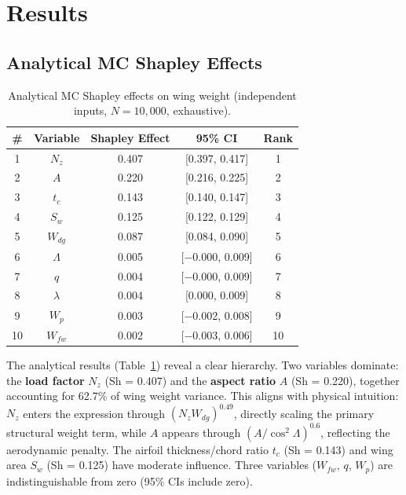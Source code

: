 \documentclass[11pt,a4paper]{article}
\begin{document}
\section{Results}

\subsection{Analytical MC Shapley Effects}

\begin{table}[H]
\centering
\caption{Analytical MC Shapley effects on wing weight (independent inputs, $N = 10{,}000$, exhaustive).}
\label{tab:shap_analytical}
\begin{tabular}{ccccc}
\toprule
\textbf{\#} & \textbf{Variable} & \textbf{Shapley Effect} & \textbf{95\% CI} & \textbf{Rank} \\
\midrule
1  & $N_z$   & 0.407 & [0.397, 0.417] & 1 \\
2  & $A$     & 0.220 & [0.216, 0.225] & 2 \\
3  & $t_c$   & 0.143 & [0.140, 0.147] & 3 \\
4  & $S_w$   & 0.125 & [0.122, 0.129] & 4 \\
5  & $W_{dg}$ & 0.087 & [0.084, 0.090] & 5 \\
6  & $\Lambda$ & 0.005 & [$-$0.000, 0.009] & 6 \\
7  & $q$     & 0.004 & [$-$0.000, 0.009] & 7 \\
8  & $\lambda$ & 0.004 & [0.000, 0.009] & 8 \\
9  & $W_p$   & 0.003 & [$-$0.002, 0.008] & 9 \\
10 & $W_{fw}$ & 0.002 & [$-$0.003, 0.006] & 10 \\
\bottomrule
\end{tabular}
\end{table}

The analytical results (Table~\ref{tab:shap_analytical}) reveal a clear hierarchy. Two variables dominate: the \textbf{load factor} $N_z$ (Sh = 0.407) and the \textbf{aspect ratio} $A$ (Sh = 0.220), together accounting for 62.7\% of wing weight variance. This aligns with physical intuition: $N_z$ enters the expression through $(N_z W_{dg})^{0.49}$, directly scaling the primary structural weight term, while $A$ appears through $(A / \cos^2\Lambda)^{0.6}$, reflecting the aerodynamic penalty. The airfoil thickness/chord ratio $t_c$ (Sh = 0.143) and wing area $S_w$ (Sh = 0.125) have moderate influence. Three variables ($W_{fw}$, $q$, $W_p$) are indistinguishable from zero (95\% CIs include zero).
\end{document}
